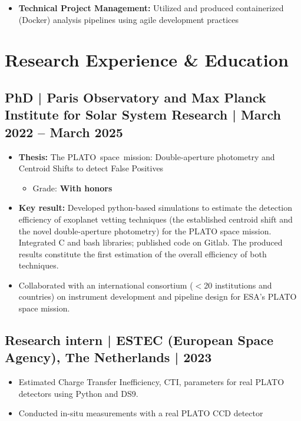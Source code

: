 \documentclass[11pt,a4paper]{article}
\begin{document}
\begin{multicols}{2}
\begin{itemize}
			\item \textbf{Technical Project Management:} Utilized and produced containerized (Docker) analysis pipelines using agile development practices
		\end{itemize}
		
		
		\section{Research Experience \& Education}
		\subsection{ PhD | Paris Observatory and Max Planck Institute for Solar System Research | March 2022 – March 2025}
		\begin{itemize}
			\item \textbf{Thesis:} The \mbox{PLATO space mission:} Double-aperture photometry and Centroid Shifts to detect False Positives
			\begin{itemize}
				\item Grade: \textbf{With honors}
			\end{itemize}
			\item \textbf{Key result:} Developed python-based simulations to estimate the detection efficiency of exoplanet vetting techniques (the established centroid shift and the novel double-aperture photometry) for the PLATO space mission. Integrated C and bash libraries; published code on Gitlab. The produced results constitute the first estimation of the overall efficiency of both techniques.
			\item Collaborated with an international consortium ($<$20 institutions and countries) on instrument development and pipeline design for ESA's PLATO space mission.
		\end{itemize}
		
		\subsection{Research intern | ESTEC (European Space Agency), The Netherlands | 2023}
		\begin{itemize}
			\item Estimated Charge Transfer Inefficiency, CTI, parameters for real PLATO detectors using Python and DS9.
			\item Conducted in-situ measurements with a real PLATO CCD detector
		\end{itemize}
		

\end{multicols}
\end{document}
